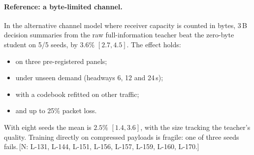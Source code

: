 \documentclass[11pt]{article}
\theoremstyle{definition}
\newif\ifshownotes\shownotestrue
\newcommand{\NOTE}[1]{\ifshownotes{\color{notecol}\,\textsf{\footnotesize[N: #1]}}\fi}
\begin{document}
\paragraph{Reference: a byte-limited channel.} In the alternative channel model where receiver capacity is counted in
bytes, 3\,B decision summaries from the raw full-information teacher beat the zero-byte student on 5/5 seeds, by $3.6\%$
$[2.7,4.5]$. The effect holds:
\begin{itemize}
\item on three pre-registered panels;
\item under unseen demand (headways 6, 12 and 24\,s);
\item with a codebook refitted on other traffic;
\item and up to 25\% packet loss.
\end{itemize}
With eight seeds the mean is $2.5\%$ $[1.4,3.6]$, with the size tracking the teacher's quality. Training directly on
compressed payloads is fragile: one of three seeds fails.\NOTE{L-131, L-144, L-151, L-156, L-157, L-159, L-160, L-170.}
\end{document}
